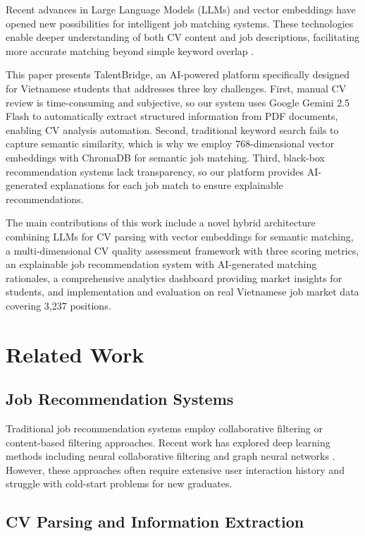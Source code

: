 \documentclass[conference]{IEEEtran}
\begin{document}
Recent advances in Large Language Models (LLMs) and vector embeddings have opened new possibilities for intelligent job matching systems. These technologies enable deeper understanding of both CV content and job descriptions, facilitating more accurate matching beyond simple keyword overlap \cite{b2}.

This paper presents TalentBridge, an AI-powered platform specifically designed for Vietnamese students that addresses three key challenges. First, manual CV review is time-consuming and subjective, so our system uses Google Gemini 2.5 Flash to automatically extract structured information from PDF documents, enabling CV analysis automation. Second, traditional keyword search fails to capture semantic similarity, which is why we employ 768-dimensional vector embeddings with ChromaDB for semantic job matching. Third, black-box recommendation systems lack transparency, so our platform provides AI-generated explanations for each job match to ensure explainable recommendations.

The main contributions of this work include a novel hybrid architecture combining LLMs for CV parsing with vector embeddings for semantic matching, a multi-dimensional CV quality assessment framework with three scoring metrics, an explainable job recommendation system with AI-generated matching rationales, a comprehensive analytics dashboard providing market insights for students, and implementation and evaluation on real Vietnamese job market data covering 3,237 positions.

\section{Related Work}

\subsection{Job Recommendation Systems}

Traditional job recommendation systems employ collaborative filtering \cite{b3} or content-based filtering approaches. Recent work has explored deep learning methods including neural collaborative filtering and graph neural networks \cite{b4}. However, these approaches often require extensive user interaction history and struggle with cold-start problems for new graduates.

\subsection{CV Parsing and Information Extraction}
\end{document}

